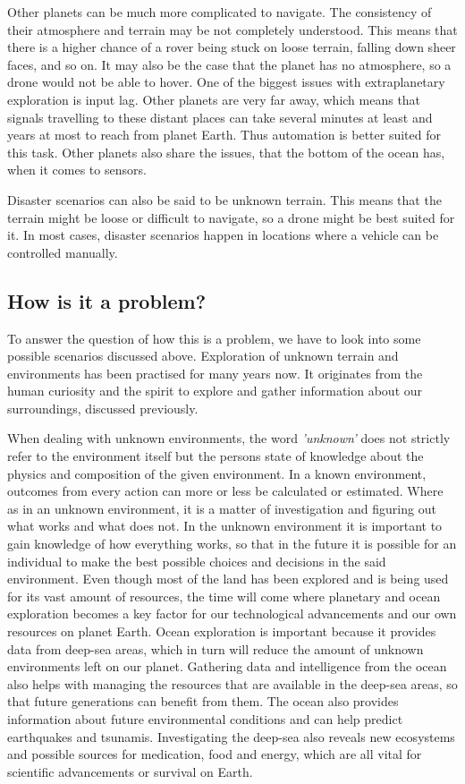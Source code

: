 Other planets can be much more complicated to navigate. The consistency of their atmosphere and terrain may be not completely understood. This means that there is a higher chance of a rover being stuck on loose terrain, falling down sheer faces, and so on. It may also be the case that the planet has no atmosphere, so a drone would not be able to hover. One of the biggest issues with extraplanetary exploration is input lag. Other planets are very far away, which means that signals travelling to these distant places can take several minutes at least and years at most to reach from planet Earth. Thus automation is better suited for this task. Other planets also share the issues, that the bottom of the ocean has, when it comes to sensors.

Disaster scenarios can also be said to be unknown terrain. This means that the terrain might be loose or difficult to navigate, so a drone might be best suited for it. In most cases, disaster scenarios happen in locations where a vehicle can be controlled manually.

\subsection{How is it a problem?}

To answer the question of how this is a problem, we have to look into some possible scenarios discussed above. Exploration of unknown terrain and environments has been practised for many years now. It originates from the human curiosity and the spirit to explore and gather information about our surroundings, discussed previously.

When dealing with unknown environments, the word \textit{'unknown'} does not strictly refer to the environment itself but the persons state of knowledge about the physics and composition of the given environment. In a known environment, outcomes from every action can more or less be calculated or estimated. Where as in an unknown environment, it is a matter of investigation and figuring out what works and what does not. In the unknown environment it is important to gain knowledge of how everything works, so that in the future it is possible for an individual to make the best possible choices and decisions in the said environment\cite{aiint}.
Even though most of the land has been explored and is being used for its vast amount of resources, the time will come where planetary and ocean exploration becomes a key factor for our technological advancements and our own resources on planet Earth. Ocean exploration is important because it provides data from deep-sea areas, which in turn will reduce the amount of unknown environments left on our planet.
Gathering data and intelligence from the ocean also helps with managing the resources that are available in the deep-sea areas, so that future generations can benefit from them. The ocean also provides information about future environmental conditions and can help predict earthquakes and tsunamis. Investigating the deep-sea also reveals new ecosystems and possible sources for medication, food and energy, which are all vital for scientific advancements or survival on Earth\cite{oceanexplo}.


